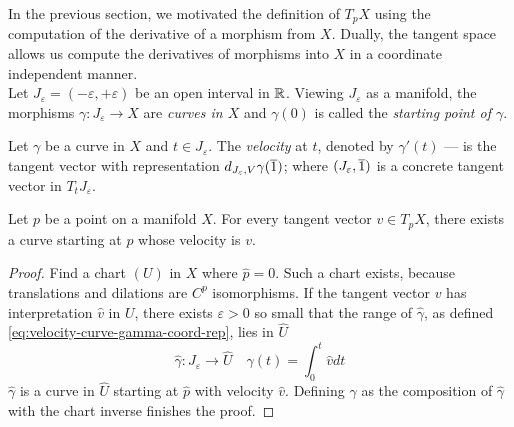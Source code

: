 \documentclass[../main-manifolds.tex]{subfiles}
\begin{document}
In the previous section, we motivated the definition of $T_pX$ using the computation of the derivative of a morphism from $X$. Dually, the tangent space allows us compute the derivatives of morphisms into $X$ in a coordinate independent manner.\\

Let $J_\varepsilon = (-\varepsilon, +\varepsilon)$ be an open interval in $\mathbb{R}$. Viewing $J_\varepsilon$ as a manifold, the morphisms $\gamma: J_\varepsilon\to X$ are \emph{curves in $X$} and $\gamma(0)$ is called the \emph{starting point of $\gamma$}.
\begin{definition}\label{def:velocity-of-a-curve}
    Let $\gamma$ be a curve in $X$ and $t\in J_\varepsilon$. The \emph{velocity} at $t$, denoted by $\gamma'(t)$ --- is the tangent vector with representation $d_{J_\varepsilon,V}\gamma(\overline{1})$; where $(J_\varepsilon,\overline{1})$ is a concrete tangent vector in $T_t J_\varepsilon$.
\end{definition}
\begin{wts}\label{prop:tangent-vectors-are-velocities}
    Let $p$ be a point on a manifold $X$. For every tangent vector $v\in T_p X$, there exists a curve starting at $p$ whose velocity is $v$.
\end{wts}
\begin{proof}
    Find a chart $(U)$ in $X$ where $\hat{p}=0$. Such a chart exists, because translations and dilations are $C^p$ isomorphisms. If the tangent vector $v$ has interpretation $\hat{v}$ in $U$, there exists $\varepsilon>0$ so small that the range of $\hat{\gamma}$, as defined \cref{eq:velocity-curve-gamma-coord-rep}, lies in $\hat{U}$
    \begin{equation}\label{eq:velocity-curve-gamma-coord-rep}
        \hat{\gamma}: J_\varepsilon\to \hat{U}\quad \gamma(t) = \int_0^t \hat{v}dt
    \end{equation}
    $\hat{\gamma}$ is a curve in $\hat{U}$ starting at $\hat{p}$ with velocity $\hat{v}$. Defining $\gamma$ as the composition of $\hat{\gamma}$ with the chart inverse finishes the proof.
\end{proof}
\end{document}
